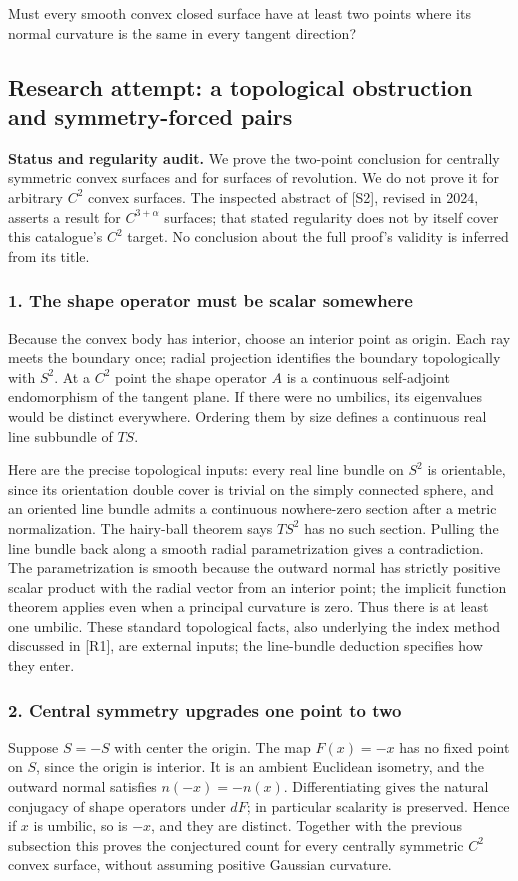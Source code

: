 \documentclass[11pt,a4paper]{article}
\begin{document}
Must every smooth convex closed surface have at least two points where its normal curvature is the same in every tangent direction?

\subsection{Research attempt: a topological obstruction and symmetry-forced pairs}
\textbf{Status and regularity audit.} We prove the two-point conclusion for centrally symmetric convex surfaces and for surfaces of revolution. We do not prove it for arbitrary $C^2$ convex surfaces. The inspected abstract of [S2], revised in 2024, asserts a result for $C^{3+\alpha}$ surfaces; that stated regularity does not by itself cover this catalogue's $C^2$ target. No conclusion about the full proof's validity is inferred from its title.

\subsubsection{1. The shape operator must be scalar somewhere}
Because the convex body has interior, choose an interior point as origin. Each ray meets the boundary once; radial projection identifies the boundary topologically with $S^2$. At a $C^2$ point the shape operator $A$ is a continuous self-adjoint endomorphism of the tangent plane. If there were no umbilics, its eigenvalues would be distinct everywhere. Ordering them by size defines a continuous real line subbundle of $TS$.

Here are the precise topological inputs: every real line bundle on $S^2$ is orientable, since its orientation double cover is trivial on the simply connected sphere, and an oriented line bundle admits a continuous nowhere-zero section after a metric normalization. The hairy-ball theorem says $TS^2$ has no such section. Pulling the line bundle back along a smooth radial parametrization gives a contradiction. The parametrization is smooth because the outward normal has strictly positive scalar product with the radial vector from an interior point; the implicit function theorem applies even when a principal curvature is zero. Thus there is at least one umbilic. These standard topological facts, also underlying the index method discussed in [R1], are external inputs; the line-bundle deduction specifies how they enter.

\subsubsection{2. Central symmetry upgrades one point to two}
Suppose $S=-S$ with center the origin. The map $F(x)=-x$ has no fixed point on $S$, since the origin is interior. It is an ambient Euclidean isometry, and the outward normal satisfies $n(-x)=-n(x)$. Differentiating gives the natural conjugacy of shape operators under $dF$; in particular scalarity is preserved. Hence if $x$ is umbilic, so is $-x$, and they are distinct. Together with the previous subsection this proves the conjectured count for every centrally symmetric $C^2$ convex surface, without assuming positive Gaussian curvature.
\end{document}
